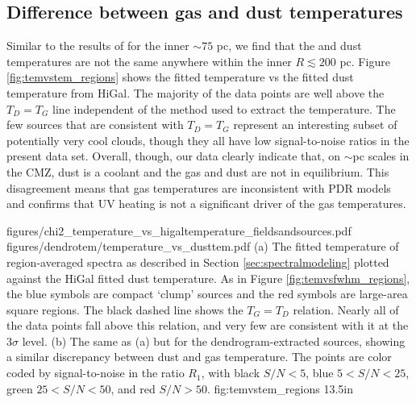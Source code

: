 \subsection{Difference between gas and dust temperatures}
\label{sec:td_ne_tg}
Similar to the results of \citet{Ao2013a} for the inner $\sim75$ pc, we find
that the \para and dust temperatures are not the same anywhere within the
inner $R\lesssim200$ pc.  Figure \ref{fig:temvstem_regions} shows the fitted \para
temperature vs the fitted dust temperature from HiGal.  The majority of the
\formaldehyde data points are well above the $T_{D}=T_{G}$ line
independent of the method used to extract the temperature.  The few sources
that are consistent with $T_{D}=T_{G}$ represent an interesting subset
of potentially very cool clouds, though they all have low signal-to-noise
ratios in the present data set.  Overall, though, our data clearly indicate
that, on $\sim$pc scales in the CMZ, dust is a coolant and the gas and dust are
not in equilibrium.  This disagreement means that gas temperatures are
inconsistent with PDR models \citep{Hollenbach1999a} and confirms that UV
heating is not a significant driver of the gas temperatures.


\FigureTwo
{figures/chi2_temperature_vs_higaltemperature_fieldsandsources.pdf} %
{figures/dendrotem/temperature_vs_dusttem.pdf} %
{(a) The fitted temperature of region-averaged spectra as described in
Section \ref{sec:spectralmodeling} plotted against the HiGal fitted dust
temperature.  As in Figure \ref{fig:temvsfwhm_regions}, the blue symbols are
compact `clump' sources and the red symbols are large-area square regions.  The
black dashed line shows the $T_G = T_D$ relation.  Nearly all of the data
points fall above this relation, and very few are consistent with it at the
3$\sigma$ level.
(b) The same as (a) but for the dendrogram-extracted sources, showing a similar
discrepancy between dust and gas temperature.  The points are color coded by
signal-to-noise in the
ratio $R_1$, with black $S/N < 5$, blue $5 < S/N < 25$, green $25 < S/N < 50$,
and red $S/N > 50$.  }
{fig:temvstem_regions}
{1}{3.5in}


